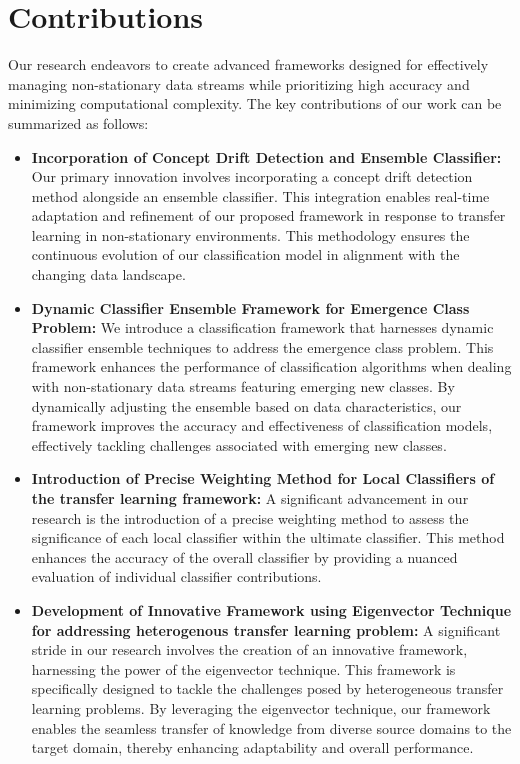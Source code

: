 \section{Contributions}
\label{sec:1_introduction_contribution}
Our research endeavors to create advanced frameworks designed for effectively managing non-stationary data streams while prioritizing high accuracy and minimizing computational complexity. The key contributions of our work can be summarized as follows:
\begin{itemize}
    \item \textbf{Incorporation of Concept Drift Detection and Ensemble Classifier:} Our primary innovation involves incorporating a concept drift detection method alongside an ensemble classifier. This integration enables real-time adaptation and refinement of our proposed framework in response to transfer learning in non-stationary environments. This methodology ensures the continuous evolution of our classification model in alignment with the changing data landscape.
    \item \textbf{Dynamic Classifier Ensemble Framework for Emergence Class Problem:} We introduce a classification framework that harnesses dynamic classifier ensemble techniques to address the emergence class problem. This framework enhances the performance of classification algorithms when dealing with non-stationary data streams featuring emerging new classes. By dynamically adjusting the ensemble based on data characteristics, our framework improves the accuracy and effectiveness of classification models, effectively tackling challenges associated with emerging new classes.
    \item \textbf{Introduction of Precise Weighting Method for Local Classifiers of the transfer learning framework:} A significant advancement in our research is the introduction of a precise weighting method to assess the significance of each local classifier within the ultimate classifier. This method enhances the accuracy of the overall classifier by providing a nuanced evaluation of individual classifier contributions.
    \item \textbf{Development of Innovative Framework using Eigenvector Technique for addressing heterogenous transfer learning problem:} A significant stride in our research involves the creation of an innovative framework, harnessing the power of the eigenvector technique. This framework is specifically designed to tackle the challenges posed by heterogeneous transfer learning problems. By leveraging the eigenvector technique, our framework enables the seamless transfer of knowledge from diverse source domains to the target domain, thereby enhancing adaptability and overall performance.

\end{itemize}
